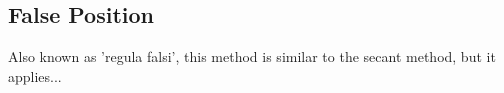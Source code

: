 \subsection{False Position}
Also known as 'regula falsi', this method is similar to the secant method, but it applies...


